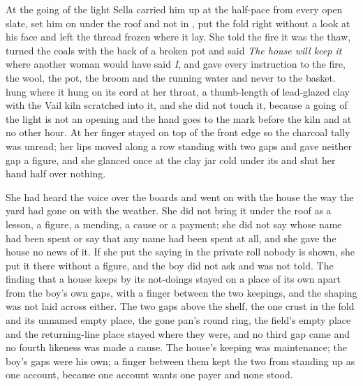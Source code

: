At the going of the light Sella carried him up at the half-pace from every open slate, set him on  under the roof and not in , put the fold right without a look at his face and left the thread frozen where it lay. She told the fire it was the thaw, turned the coals with the back of a broken pot and said \emph{The house will keep it} where another woman would have said \emph{I}, and gave every instruction to the fire, the wool, the pot, the broom and the running water and never to the basket.  hung where it hung on its cord at her throat, a thumb-length of lead-glazed clay with the Vail kiln scratched into it, and she did not touch it, because a going of the light is not an opening and the hand goes to the mark before the kiln and at no other hour. At  her finger stayed on top of the front edge so the charcoal tally was unread; her lips moved along a row standing with two gaps and gave neither gap a figure, and she glanced once at the clay jar cold under its  and shut her hand half over nothing.

She had heard the voice over the boards and went on with the house the way the yard had gone on with the weather. She did not bring it under the roof as a lesson, a figure, a mending, a cause or a payment; she did not say whose name had been spent or say that any name had been spent at all, and she gave the house no news of it. If she put the saying in the private roll nobody is shown, she put it there without a figure, and the boy did not ask and was not told. The finding that a house keeps by its not-doings stayed on a place of its own apart from the boy's own gaps, with a finger between the two keepings, and the shaping was not laid across either. The two gaps above the shelf, the one crust in the fold and its unnamed empty place, the gone pan's round ring, the field's empty place and the returning-line place stayed where they were, and no third gap came and no fourth likeness was made a cause. The house's keeping was maintenance; the boy's gaps were his own; a finger between them kept the two from standing up as one account, because one account wants one payer and none stood.

